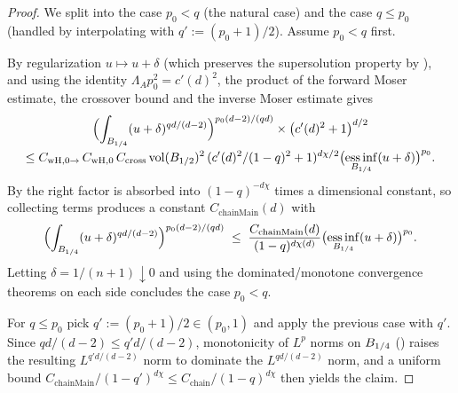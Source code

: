 \begin{proof}
\leanok
{}

We split into the case $p_0 < q$ (the natural case) and the case $q \leq p_0$
(handled by interpolating with $q' := (p_0+1)/2$). Assume $p_0 < q$ first.

By regularization $u \mapsto u + \delta$ (which preserves the supersolution
property by ), and using the
identity $\Lambda_A p_0^2 = c'(d)^2$, the product of the forward Moser
estimate, the crossover bound and the inverse Moser estimate gives
\begin{multline*}
  \Bigl(\int_{B_{1/4}}(u+\delta)^{q d/(d-2)}\Bigr)^{p_0(d-2)/(q d)}
  \times \bigl(c'(d)^2 + 1\bigr)^{d/2}
  \\[-2pt]
  \leq C_{\mathrm{wH},0\to}\,C_{\mathrm{wH},0}\,C_{\mathrm{cross}}\,
       \mathrm{vol}(B_{1/2})^2\,(c'(d)^2/(1-q)^2 + 1)^{d\chi/2}
       \bigl(\operatorname*{ess\,inf}_{B_{1/4}}(u+\delta)\bigr)^{p_0}.
\end{multline*}
By  the right factor is
absorbed into $(1-q)^{-d\chi}$ times a dimensional constant, so collecting
terms produces a constant $C_{\mathrm{chainMain}}(d)$ with
\begin{equation*}
  \Bigl(\int_{B_{1/4}} (u+\delta)^{qd/(d-2)}\Bigr)^{p_0(d-2)/(qd)}
  \;\leq\; \frac{C_{\mathrm{chainMain}}(d)}{(1-q)^{d\chi(d)}}
        \bigl(\operatorname*{ess\,inf}_{B_{1/4}}(u+\delta)\bigr)^{p_0}.
\end{equation*}
Letting $\delta = 1/(n+1) \downarrow 0$ and using the dominated/monotone
convergence theorems on each side concludes the case $p_0 < q$.

For $q \leq p_0$ pick $q' := (p_0+1)/2 \in (p_0,1)$ and apply the previous
case with $q'$. Since $q d/(d-2) \leq q' d/(d-2)$, monotonicity of $L^p$ norms
on $B_{1/4}$ () raises the resulting
$L^{q' d/(d-2)}$ norm to dominate the $L^{q d/(d-2)}$ norm, and a uniform
bound $C_{\mathrm{chainMain}}/(1-q')^{d\chi} \leq C_{\mathrm{chain}}/(1-q)^{d\chi}$
 then yields the claim.
\end{proof}

